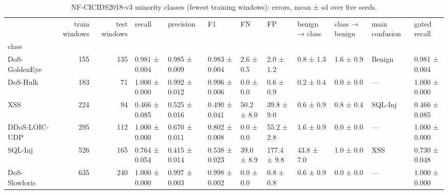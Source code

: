 \begin{table}
\caption{NF-CICIDS2018-v3 minority classes (fewest training windows): errors, mean ± sd over five seeds.}
\label{tab:table3_minority}
\begin{tabular}{lrrlllllllll}
\toprule
 & train windows & test windows & recall & precision & F1 & FN & FP & benign → class & class → benign & main confusion & gated recall \\
class &  &  &  &  &  &  &  &  &  &  &  \\
\midrule
DoS-GoldenEye & 155 & 135 & 0.981 ± 0.004 & 0.985 ± 0.009 & 0.983 ± 0.004 & 2.6 ± 0.5 & 2.0 ± 1.2 & 0.8 ± 1.3 & 1.6 ± 0.9 & Benign & 0.981 ± 0.004 \\
DoS-Hulk & 183 & 71 & 1.000 ± 0.000 & 0.992 ± 0.012 & 0.996 ± 0.006 & 0.0 ± 0.0 & 0.6 ± 0.9 & 0.2 ± 0.4 & 0.0 ± 0.0 & — & 1.000 ± 0.000 \\
XSS & 224 & 94 & 0.466 ± 0.085 & 0.525 ± 0.016 & 0.490 ± 0.041 & 50.2 ± 8.0 & 39.8 ± 9.0 & 0.6 ± 0.9 & 0.8 ± 0.4 & SQL-Inj & 0.466 ± 0.085 \\
DDoS-LOIC-UDP & 295 & 112 & 1.000 ± 0.000 & 0.670 ± 0.011 & 0.802 ± 0.008 & 0.0 ± 0.0 & 55.2 ± 2.8 & 1.6 ± 0.9 & 0.0 ± 0.0 & — & 1.000 ± 0.000 \\
SQL-Inj & 526 & 165 & 0.764 ± 0.054 & 0.415 ± 0.014 & 0.538 ± 0.023 & 39.0 ± 8.9 & 177.4 ± 9.8 & 43.8 ± 7.0 & 1.0 ± 0.0 & XSS & 0.730 ± 0.048 \\
DoS-Slowloris & 635 & 240 & 1.000 ± 0.000 & 0.997 ± 0.003 & 0.998 ± 0.002 & 0.0 ± 0.0 & 0.8 ± 0.8 & 0.6 ± 0.9 & 0.0 ± 0.0 & — & 1.000 ± 0.000 \\
\bottomrule
\end{tabular}
\end{table}
